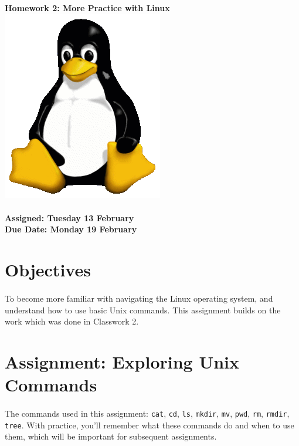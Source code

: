 \documentclass[letter,11pt]{article}
\begin{document}
\huge
\textbf{Homework 2: More Practice with Linux} \includegraphics[scale=0.07]{Images/Tux.png}
\normalsize
\\ ~~ \\
\textbf{Assigned: Tuesday 13 February} \\
\textbf{Due Date: Monday 19 February}

\section*{Objectives}
\paragraph{}To become more familiar with navigating the Linux operating system, and understand how to use basic Unix commands. This assignment builds on the work which was done in Classwork 2.

\section*{Assignment: Exploring Unix Commands}
\paragraph{}The commands used in this assignment: \texttt{cat}, \texttt{cd}, \texttt{ls}, \texttt{mkdir}, \texttt{mv}, \texttt{pwd}, \texttt{rm}, \texttt{rmdir}, \texttt{tree}. With practice, you'll remember what these commands do and when to use them, which will be important for subsequent assignments.
\end{document}
